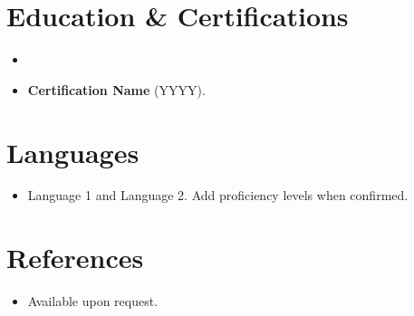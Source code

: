\documentclass[11pt,a4paper,sans]{moderncv}
\begin{document}
\section{Education \& Certifications}
\vspace{1pt}
\begin{itemize}
\item{}
\item \textbf{Certification Name} (YYYY).
\end{itemize}

\section{Languages}
\vspace{1pt}
\begin{itemize}
\item Language 1 and Language 2. Add proficiency levels when confirmed.
\end{itemize}

\section{References}
\vspace{1pt}
\begin{itemize}
\item{Available upon request.}
\end{itemize}
\end{document}
